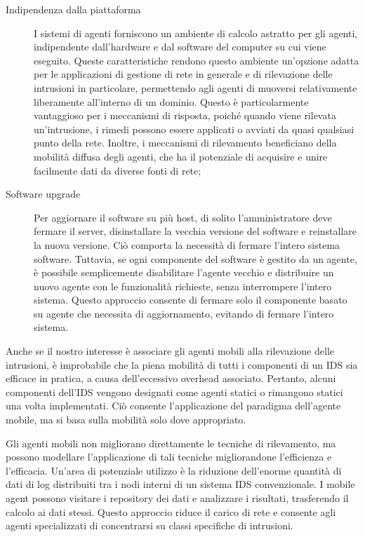 \begin{description}
    \item [Indipendenza dalla piattaforma]  I sistemi di agenti forniscono un ambiente di calcolo astratto per gli agenti, indipendente dall'hardware e dal software del computer su cui viene eseguito. Queste caratteristiche rendono questo ambiente un'opzione adatta per le applicazioni di gestione di rete in generale e di rilevazione delle intrusioni in particolare, permettendo agli agenti di muoversi relativamente liberamente all'interno di un dominio. Questo è particolarmente vantaggioso per i meccanismi di risposta, poiché quando viene rilevata un'intrusione, i rimedi possono essere applicati o avviati da quasi qualsiasi punto della rete. Inoltre, i meccanismi di rilevamento beneficiano della mobilità diffusa degli agenti, che ha il potenziale di acquisire e unire facilmente dati da diverse fonti di rete;
    \item [Software upgrade] Per aggiornare il software su più host, di solito l'amministratore deve fermare il server, disinstallare la vecchia versione del software e reinstallare la nuova versione. Ciò comporta la necessità di fermare l'intero sistema software. Tuttavia, se ogni componente del software è gestito da un agente, è possibile semplicemente disabilitare l'agente vecchio e distribuire un nuovo agente con le funzionalità richieste, senza interrompere l'intero sistema. Questo approccio consente di fermare solo il componente basato su agente che necessita di aggiornamento, evitando di fermare l'intero sistema.
\end{description}


Anche se il nostro interesse è associare gli  agenti mobili alla rilevazione delle intrusioni, è improbabile che la piena mobilità di tutti i componenti di un IDS sia  efficace in pratica, a causa dell'eccessivo overhead associato. Pertanto, alcuni componenti dell'IDS vengono designati come agenti statici o rimangono statici una volta implementati. Ciò consente l'applicazione del paradigma dell'agente mobile, ma si basa sulla mobilità solo dove appropriato.

\smallskip

Gli agenti mobili non migliorano direttamente le tecniche di rilevamento, ma possono modellare l'applicazione di tali tecniche migliorandone l'efficienza e l'efficacia. Un'area di potenziale utilizzo è la riduzione dell'enorme quantità di dati di log distribuiti tra i nodi interni di un sistema IDS convenzionale. I mobile agent possono visitare i repository dei dati e analizzare i risultati, trasferendo il calcolo ai dati stessi. Questo approccio riduce il carico di rete e consente agli agenti specializzati di concentrarsi su classi specifiche di intrusioni.

